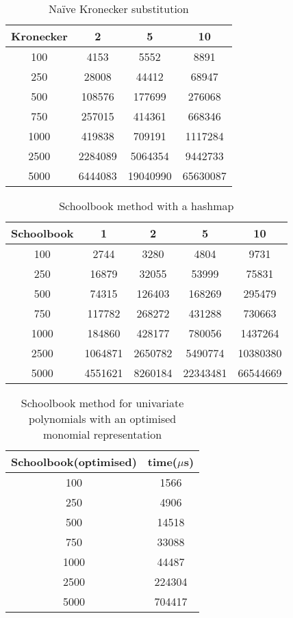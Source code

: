\begin{table}[h]
\centering
    \begin{tabular}{|c| c c c|}
        \hline
        Kronecker & 2 & 5 & 10\\
        \hline
        100 & 4153 & 5552 & 8891 \\
        250 & 28008 & 44412 & 68947 \\
        500 & 108576 & 177699 & 276068\\
        750 & 257015 & 414361 & 668346\\ 
        1000 & 419838 & 709191 & 1117284\\
        2500 & 2284089 & 5064354 & 9442733\\
        5000 & 6444083 & 19040990 & 65630087\\
        \hline
    \end{tabular}
    \caption{Na\"{i}ve Kronecker substitution}
\end{table}

\begin{table}[h]
\centering
    \begin{tabular}{|c| c c c c|}
        \hline
        Schoolbook & 1 & 2 & 5 & 10\\
        \hline
        100 & 2744 & 3280 & 4804 & 9731\\
        250 & 16879 & 32055 & 53999 & 75831\\
        500 & 74315 & 126403 & 168269 & 295479\\
        750 & 117782 & 268272 & 431288 & 730663\\
        1000 & 184860 & 428177 & 780056 & 1437264\\
        2500 & 1064871 & 2650782 & 5490774 & 10380380\\
        5000 & 4551621 & 8260184 & 22343481 & 66544669\\
        \hline
    \end{tabular}
    \caption{Schoolbook method with a hashmap}
\end{table}

\begin{table}[h]
\centering
    \begin{tabular}{|c| c |}
        \hline
        Schoolbook(optimised) & time($\mu$s)\\
        \hline
        100 & 1566 \\
        250 & 4906 \\
        500 & 14518 \\
        750 & 33088 \\
        1000 & 44487 \\
        2500 & 224304 \\
        5000 & 704417 \\
        \hline
    \end{tabular}
    \caption{Schoolbook method for univariate polynomials with an optimised monomial representation}
\end{table}


